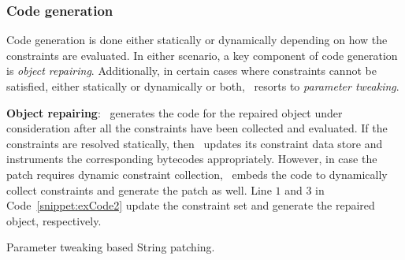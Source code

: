 \subsubsection{Code generation}
\label{sec:tool:stage2:generation}

Code generation is done either statically or dynamically depending on how
the constraints are evaluated. In either scenario, a key component of code
generation is \textit{object repairing}. Additionally, in certain cases
where constraints cannot be satisfied, either statically or dynamically or
both, \tool\ resorts to \textit{parameter tweaking}.

\begin{mylist}

 \item \textbf{Object repairing}: \tool\ generates the code for the repaired
object under consideration after all the constraints have been collected and
evaluated. If the constraints are resolved statically, then \tool\ updates its
constraint data store and instruments the corresponding bytecodes appropriately.
However, in case the patch requires dynamic constraint collection, \tool\ embeds
the code to dynamically collect constraints and generate the patch as well. Line
$1$ and $3$ in Code~\ref{snippet:exCode2} update the constraint set and generate
the repaired object, respectively.

\begin{algorithm}[t]
\scriptsize
\DontPrintSemicolon
{}
\caption{Parameter tweaking based String patching.}
\label{algo:stringPatchParametr}
\end{algorithm}


\end{mylist}
